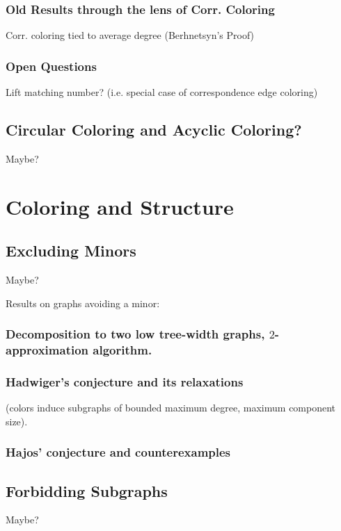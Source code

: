 \documentclass[12pt,twoside,openright,a4paper]{book}
\begin{document}
\section{Old Results through the lens of Corr. Coloring}

Corr. coloring tied to average degree (Berhnetsyn's Proof)

\section{Open Questions}

Lift matching number? (i.e. special case of correspondence edge coloring)

\chapter{Circular Coloring and Acyclic Coloring?}

Maybe?

\part{Coloring and Structure}

\chapter{Excluding Minors}

Maybe?

Results on graphs avoiding a minor:


\section{Decomposition to two low tree-width graphs, $2$-approximation algorithm.}
\section{Hadwiger's conjecture and its relaxations}
(colors induce subgraphs of bounded maximum degree, maximum component size).
\section{Hajos' conjecture and counterexamples}

\chapter{Forbidding Subgraphs}

Maybe?
\end{document}
